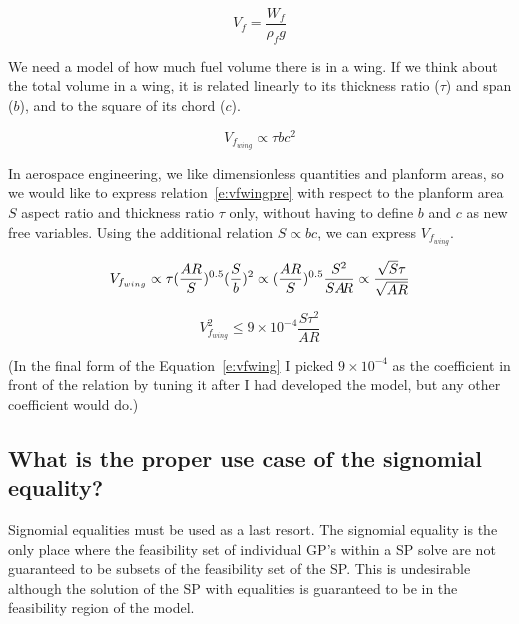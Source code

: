 \begin{equation}
    V_f = \frac{W_f } {\rho_f g}
    \label{e:vf}
\end{equation}

We need a model of how much fuel volume there is in a wing. If we think about the total
volume in a wing, it is related linearly to its thickness ratio ($\tau$) and span ($b$), 
and to the square of its chord ($c$). 

\begin{equation}
	V_{f_{wing}} \propto \tau b c^2
	\label{e:vfwingpre}
\end{equation} 

In aerospace engineering, we like dimensionless quantities and planform areas, 
so we would like to express relation~\ref{e:vfwingpre} with respect to the planform area $S$
aspect ratio \AR and thickness ratio $\tau$ only, without having to define $b$ and $c$ as new
free variables.
Using the additional relation $S \propto b c$, we can express $V_{f_{wing}}$.

\begin{equation}
	V_{f_{wing}} \propto \tau (\frac{AR}{S})^{0.5} (\frac{S}{b})^2 \propto
		(\frac{AR}{S})^{0.5} \frac{S^2}{S A\hspace{-2.0pt}R} \propto \frac{\sqrt{S}\tau}{\sqrt{AR}}
\end{equation}

\begin{equation}
\label{e:vfwing}
V_{f_{wing}}^2 \leq 9\times10^{-4} \frac{S \tau^2}{AR}
\end{equation}

(In the final form of the Equation~\ref{e:vfwing} I picked $9\times10^{-4}$ as the coefficient in
front of the relation by tuning it after I had developed
the model, but any other coefficient would do.)

\subsection{What is the proper use case of the signomial equality?} 

Signomial equalities must be used as a last resort. The signomial equality is the only place 
where the feasibility set of individual \gls{GP}'s within a \gls{SP} solve are not guaranteed 
to be subsets of the feasibility set of the \gls{SP}. This is undesirable although
the solution of the \gls{SP} with equalities is guaranteed to be in the feasibility region
of the model.
